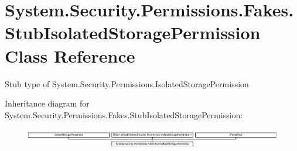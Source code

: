 \hypertarget{class_system_1_1_security_1_1_permissions_1_1_fakes_1_1_stub_isolated_storage_permission}{\section{System.\-Security.\-Permissions.\-Fakes.\-Stub\-Isolated\-Storage\-Permission Class Reference}
\label{class_system_1_1_security_1_1_permissions_1_1_fakes_1_1_stub_isolated_storage_permission}
}


Stub type of System.\-Security.\-Permissions.\-Isolated\-Storage\-Permission 


Inheritance diagram for System.\-Security.\-Permissions.\-Fakes.\-Stub\-Isolated\-Storage\-Permission\-:\begin{figure}[H]
\begin{center}
\leavevmode
\includegraphics[height=0.880503cm]{class_system_1_1_security_1_1_permissions_1_1_fakes_1_1_stub_isolated_storage_permission}
\end{center}
\end{figure}
